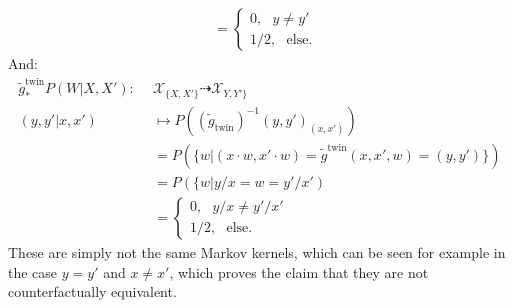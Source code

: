\begin{enumerate}[label=12.\arabic*]
\begin{gradedsolution}
\begin{enumerate}
\begin{align*}
				                                     & = \begin{cases} 0, \ \ \ y \neq y' \\ 1/2, \ \ \ \text{else}.\end{cases}
			\end{align*}
			And:
			\begin{align*}
				\tilde{g}^{\text{twin}}_* P(W | X, X'): \ \  & \mathcal{X}_{\{X,X'\}} \dashrightarrow \mathcal{X}_{Y,Y'\}}                                   \\
				(y, y' | x, x')                              & \mapsto P\left((\tilde{g}_{\text{twin}})^{-1}(y,y')_{(x,x')}\right)                           \\
				                                             & = P\left(\{w | (x \cdot w, x' \cdot w) = \tilde{g}^{\text{twin}}(x, x', w) = (y, y')\}\right) \\
				                                             & = P\left(\{w | y/x = w = y'/x'\right)                                                         \\
				                                             & = \begin{cases} 0, \ \ \ y/x \neq y'/x' \\ 1/2, \ \ \ \text{else}.\end{cases}
			\end{align*}
			These are simply not the same Markov kernels, which can be seen for example in the case $y = y'$ and $x \neq x'$, which proves the claim that they are not counterfactually equivalent.


\end{enumerate}
\end{gradedsolution}
\end{enumerate}
